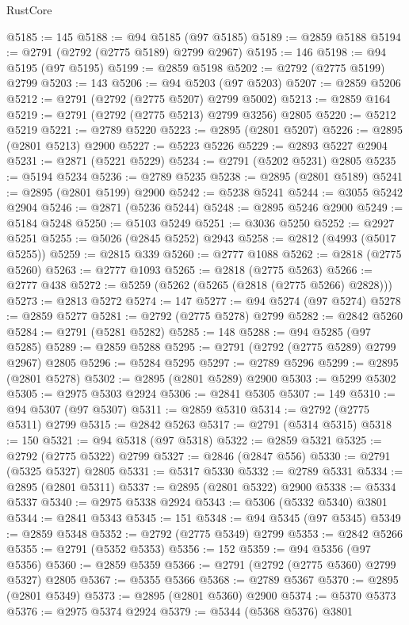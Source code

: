 \begin{lexlean}{RustCore}
\begin{coremodule}
@5185 := 145
@5188 := @94 @5185 (@97 @5185)
@5189 := @2859 @5188
@5194 := @2791 (@2792 (@2775 @5189) @2799 @2967)
@5195 := 146
@5198 := @94 @5195 (@97 @5195)
@5199 := @2859 @5198
@5202 := @2792 (@2775 @5199) @2799
@5203 := 143
@5206 := @94 @5203 (@97 @5203)
@5207 := @2859 @5206
@5212 := @2791 (@2792 (@2775 @5207) @2799 @5002)
@5213 := @2859 @164
@5219 := @2791 (@2792 (@2775 @5213) @2799 @3256) @2805
@5220 := @5212 @5219
@5221 := @2789 @5220
@5223 := @2895 (@2801 @5207)
@5226 := @2895 (@2801 @5213) @2900
@5227 := @5223 @5226
@5229 := @2893 @5227 @2904
@5231 := @2871 (@5221 @5229)
@5234 := @2791 (@5202 @5231) @2805
@5235 := @5194 @5234
@5236 := @2789 @5235
@5238 := @2895 (@2801 @5189)
@5241 := @2895 (@2801 @5199) @2900
@5242 := @5238 @5241
@5244 := @3055 @5242 @2904
@5246 := @2871 (@5236 @5244)
@5248 := @2895 @5246 @2900
@5249 := @5184 @5248
@5250 := @5103 @5249
@5251 := @3036 @5250
@5252 := @2927 @5251
@5255 := @5026 (@2845 @5252) @2943
@5258 := @2812 (@4993 (@5017 @5255))
@5259 := @2815 @339
@5260 := @2777 @1088
@5262 := @2818 (@2775 @5260)
@5263 := @2777 @1093
@5265 := @2818 (@2775 @5263)
@5266 := @2777 @438
@5272 := @5259 (@5262 (@5265 (@2818 (@2775 @5266) @2828)))
@5273 := @2813 @5272
@5274 := 147
@5277 := @94 @5274 (@97 @5274)
@5278 := @2859 @5277
@5281 := @2792 (@2775 @5278) @2799
@5282 := @2842 @5260
@5284 := @2791 (@5281 @5282)
@5285 := 148
@5288 := @94 @5285 (@97 @5285)
@5289 := @2859 @5288
@5295 := @2791 (@2792 (@2775 @5289) @2799 @2967) @2805
@5296 := @5284 @5295
@5297 := @2789 @5296
@5299 := @2895 (@2801 @5278)
@5302 := @2895 (@2801 @5289) @2900
@5303 := @5299 @5302
@5305 := @2975 @5303 @2924
@5306 := @2841 @5305
@5307 := 149
@5310 := @94 @5307 (@97 @5307)
@5311 := @2859 @5310
@5314 := @2792 (@2775 @5311) @2799
@5315 := @2842 @5263
@5317 := @2791 (@5314 @5315)
@5318 := 150
@5321 := @94 @5318 (@97 @5318)
@5322 := @2859 @5321
@5325 := @2792 (@2775 @5322) @2799
@5327 := @2846 (@2847 @556)
@5330 := @2791 (@5325 @5327) @2805
@5331 := @5317 @5330
@5332 := @2789 @5331
@5334 := @2895 (@2801 @5311)
@5337 := @2895 (@2801 @5322) @2900
@5338 := @5334 @5337
@5340 := @2975 @5338 @2924
@5343 := @5306 (@5332 @5340) @3801
@5344 := @2841 @5343
@5345 := 151
@5348 := @94 @5345 (@97 @5345)
@5349 := @2859 @5348
@5352 := @2792 (@2775 @5349) @2799
@5353 := @2842 @5266
@5355 := @2791 (@5352 @5353)
@5356 := 152
@5359 := @94 @5356 (@97 @5356)
@5360 := @2859 @5359
@5366 := @2791 (@2792 (@2775 @5360) @2799 @5327) @2805
@5367 := @5355 @5366
@5368 := @2789 @5367
@5370 := @2895 (@2801 @5349)
@5373 := @2895 (@2801 @5360) @2900
@5374 := @5370 @5373
@5376 := @2975 @5374 @2924
@5379 := @5344 (@5368 @5376) @3801

\end{coremodule}
\end{lexlean}
